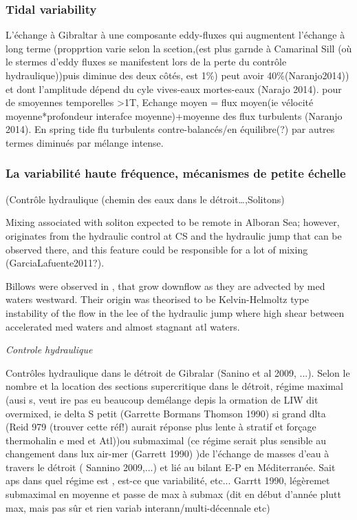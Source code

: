\subsubsection{Tidal variability}
L’échange à Gibraltar à une composante eddy-fluxes qui augmentent l’échange à long terme (propprtion varie selon la scetion,(est plus garnde à Camarinal Sill (où le stermes d’eddy fluxes se manifestent lors de la perte du contrôle hydraulique))puis diminue des deux côtés, est 1\%) peut avoir 40\%(Naranjo2014)) et dont l’amplitude dépend du cyle vives-eaux mortes-eaux (Narajo 2014). pour de smoyennes temporelles >1T, Echange moyen = flux moyen(ie vélocité moyenne*profondeur interafce moyenne)+moyenne des flux turbulents (Naranjo 2014). En spring tide flu turbulents contre-balancés/en équilibre(?) par autres termes diminués par mélange intense.





\subsubsection{La variabilité haute fréquence, mécanismes de petite échelle}
(Contrôle hydraulique (chemin des eaux dans le détroit…,Solitons)

Mixing associated with soliton expected to be remote in Alboran Sea; however, originates from the hydraulic control at CS and the hydraulic jump that can be observed there, and this feature could be responsible for a lot of mixing (GarciaLafuente2011?).

Billows were observed in \citet{WG94} , that grow downflow as they are advected by med waters westward. Their origin was theorised to be Kelvin-Helmoltz type instability of the flow in the lee of the hydraulic jump where high shear between accelerated med waters and almost stagnant atl waters.



\textit{Controle hydraulique}

Contrôles hydraulique dans le détroit de Gibralar (Sanino et al 2009, ...). Selon le nombre et la location des sections supercritique dans le détroit, régime maximal (ausi s, veut ire pas eu beaucoup demélange depis la ormation de LIW dit overmixed, ie delta S petit (Garrette Bormans Thomson 1990) si grand dlta (Reid 979 (trouver cette réf!) aurait réponse plus lente à stratif et forçage thermohalin e med et Atl))ou submaximal (ce régime serait plus sensible au changement dans lux air-mer (Garrett 1990) )de l'échange de masses d'eau à travers le détroit ( Sannino 2009,...) et lié au bilant E-P en Méditerranée. Sait aps dans quel régime est , est-ce que variabilité, etc... Garrtt 1990, légèremet submaximal en moyenne et passe de max à submax (dit en début d'année plutt max, mais pas sûr et rien variab interann/multi-décennale etc)

